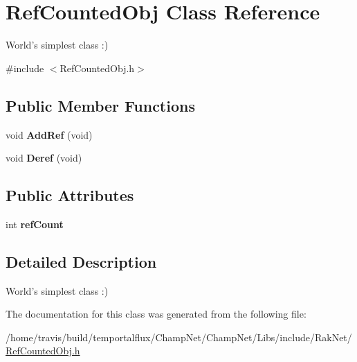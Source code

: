 \hypertarget{class_ref_counted_obj}{\section{Ref\-Counted\-Obj Class Reference}
\label{class_ref_counted_obj}
}


World's simplest class \-:)  




{\ttfamily \#include $<$Ref\-Counted\-Obj.\-h$>$}

\subsection*{Public Member Functions}
\begin{DoxyCompactItemize}
\item 
\hypertarget{class_ref_counted_obj_a9241e7b1789d9527adede6b3c6b40bb9}{void {\bfseries Add\-Ref} (void)}\label{class_ref_counted_obj_a9241e7b1789d9527adede6b3c6b40bb9}

\item 
\hypertarget{class_ref_counted_obj_ab1a8548d173d7a37c0ef5770014a1f60}{void {\bfseries Deref} (void)}\label{class_ref_counted_obj_ab1a8548d173d7a37c0ef5770014a1f60}

\end{DoxyCompactItemize}
\subsection*{Public Attributes}
\begin{DoxyCompactItemize}
\item 
\hypertarget{class_ref_counted_obj_a8c7fd196db5c209de8fa1fb3ef6e2d05}{int {\bfseries ref\-Count}}\label{class_ref_counted_obj_a8c7fd196db5c209de8fa1fb3ef6e2d05}

\end{DoxyCompactItemize}


\subsection{Detailed Description}
World's simplest class \-:) 

The documentation for this class was generated from the following file\-:\begin{DoxyCompactItemize}
\item 
/home/travis/build/temportalflux/\-Champ\-Net/\-Champ\-Net/\-Libs/include/\-Rak\-Net/\hyperlink{_ref_counted_obj_8h}{Ref\-Counted\-Obj.\-h}\end{DoxyCompactItemize}
